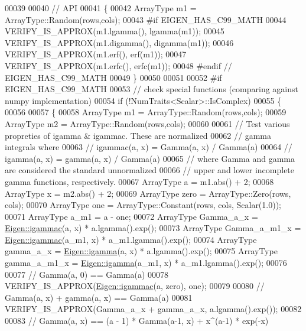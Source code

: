 \begin{DoxyCode}
00039 
00040   \textcolor{comment}{// API}
00041   \{
00042     ArrayType m1 = ArrayType::Random(rows,cols);
00043 \textcolor{preprocessor}{#if EIGEN\_HAS\_C99\_MATH}
00044     VERIFY\_IS\_APPROX(m1.lgamma(), lgamma(m1));
00045     VERIFY\_IS\_APPROX(m1.digamma(), digamma(m1));
00046     VERIFY\_IS\_APPROX(m1.erf(), erf(m1));
00047     VERIFY\_IS\_APPROX(m1.erfc(), erfc(m1));
00048 \textcolor{preprocessor}{#endif  // EIGEN\_HAS\_C99\_MATH}
00049   \}
00050 
00051 
00052 \textcolor{preprocessor}{#if EIGEN\_HAS\_C99\_MATH}
00053   \textcolor{comment}{// check special functions (comparing against numpy implementation)}
00054   \textcolor{keywordflow}{if} (!NumTraits<Scalar>::IsComplex)
00055   \{
00056 
00057     \{
00058       ArrayType m1 = ArrayType::Random(rows,cols);
00059       ArrayType m2 = ArrayType::Random(rows,cols);
00060 
00061       \textcolor{comment}{// Test various propreties of igamma & igammac.  These are normalized}
00062       \textcolor{comment}{// gamma integrals where}
00063       \textcolor{comment}{//   igammac(a, x) = Gamma(a, x) / Gamma(a)}
00064       \textcolor{comment}{//   igamma(a, x) = gamma(a, x) / Gamma(a)}
00065       \textcolor{comment}{// where Gamma and gamma are considered the standard unnormalized}
00066       \textcolor{comment}{// upper and lower incomplete gamma functions, respectively.}
00067       ArrayType a = m1.abs() + 2;
00068       ArrayType x = m2.abs() + 2;
00069       ArrayType zero = ArrayType::Zero(rows, cols);
00070       ArrayType one = ArrayType::Constant(rows, cols, Scalar(1.0));
00071       ArrayType a\_m1 = a - one;
00072       ArrayType Gamma\_a\_x = \hyperlink{namespace_eigen_a1abaa2ff8c7b1871eaf026a47c6bbf3b}{Eigen::igammac}(a, x) * a.lgamma().exp();
00073       ArrayType Gamma\_a\_m1\_x = \hyperlink{namespace_eigen_a1abaa2ff8c7b1871eaf026a47c6bbf3b}{Eigen::igammac}(a\_m1, x) * a\_m1.lgamma().exp();
00074       ArrayType gamma\_a\_x = \hyperlink{namespace_eigen_af5aa651137636b1cdbd27de1cfe91148}{Eigen::igamma}(a, x) * a.lgamma().exp();
00075       ArrayType gamma\_a\_m1\_x = \hyperlink{namespace_eigen_af5aa651137636b1cdbd27de1cfe91148}{Eigen::igamma}(a\_m1, x) * a\_m1.lgamma().exp();
00076 
00077       \textcolor{comment}{// Gamma(a, 0) == Gamma(a)}
00078       VERIFY\_IS\_APPROX(\hyperlink{namespace_eigen_a1abaa2ff8c7b1871eaf026a47c6bbf3b}{Eigen::igammac}(a, zero), one);
00079 
00080       \textcolor{comment}{// Gamma(a, x) + gamma(a, x) == Gamma(a)}
00081       VERIFY\_IS\_APPROX(Gamma\_a\_x + gamma\_a\_x, a.lgamma().exp());
00082 
00083       \textcolor{comment}{// Gamma(a, x) == (a - 1) * Gamma(a-1, x) + x^(a-1) * exp(-x)}

\end{DoxyCode}
